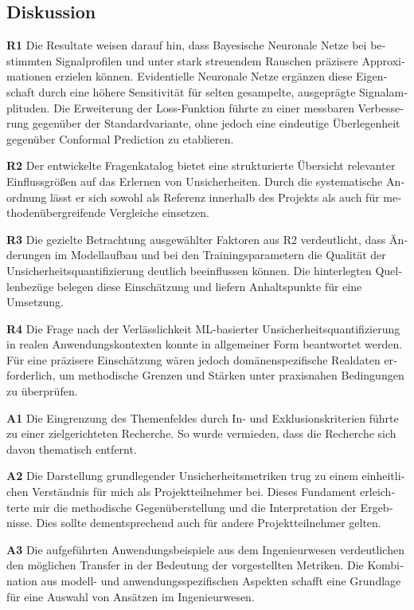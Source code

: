 \begin{otherlanguage}{ngerman}




\section{Diskussion}

\textbf{R1} Die Resultate weisen darauf hin, dass Bayesische Neuronale Netze bei bestimmten Signalprofilen und unter stark streuendem Rauschen präzisere Approximationen erzielen können. Evidentielle Neuronale Netze ergänzen diese Eigenschaft durch eine höhere Sensitivität für selten gesampelte, ausgeprägte Signalamplituden. Die Erweiterung der Loss-Funktion führte zu einer messbaren Verbesserung gegenüber der Standardvariante, ohne jedoch eine eindeutige Überlegenheit gegenüber Conformal Prediction zu etablieren.

\textbf{R2} Der entwickelte Fragenkatalog bietet eine strukturierte Übersicht relevanter Einflussgrößen auf das Erlernen von Unsicherheiten. Durch die systematische Anordnung lässt er sich sowohl als Referenz innerhalb des Projekts als auch für methodenübergreifende Vergleiche einsetzen.

\textbf{R3} Die gezielte Betrachtung ausgewählter Faktoren aus R2 verdeutlicht, dass Änderungen im Modellaufbau und bei den Trainingsparametern die Qualität der Unsicherheitsquantifizierung deutlich beeinflussen können. Die hinterlegten Quellenbezüge belegen diese Einschätzung und liefern Anhaltspunkte für eine Umsetzung.

\textbf{R4} Die Frage nach der Verlässlichkeit ML-basierter Unsicherheitsquantifizierung in realen Anwendungskontexten konnte in allgemeiner Form beantwortet werden. Für eine präzisere Einschätzung wären jedoch domänenspezifische Realdaten erforderlich, um methodische Grenzen und Stärken unter praxisnahen Bedingungen zu überprüfen.

\textbf{A1} Die Eingrenzung des Themenfeldes durch In- und Exklusionskriterien führte zu einer zielgerichteten Recherche. So wurde vermieden, dass die Recherche sich davon thematisch entfernt.

\textbf{A2} Die Darstellung grundlegender Unsicherheitsmetriken trug zu einem einheitlichen Verständnis für mich als Projektteilnehmer bei. Dieses Fundament erleichterte mir die methodische Gegenüberstellung und die Interpretation der Ergebnisse. Dies sollte dementsprechend auch für andere Projektteilnehmer gelten.

\textbf{A3} Die aufgeführten Anwendungsbeispiele aus dem Ingenieurwesen verdeutlichen den möglichen Transfer in der Bedeutung der vorgestellten Metriken. Die Kombination aus modell- und anwendungsspezifischen Aspekten schafft eine Grundlage für eine Auswahl von Ansätzen im Ingenieurwesen.


\end{otherlanguage}
